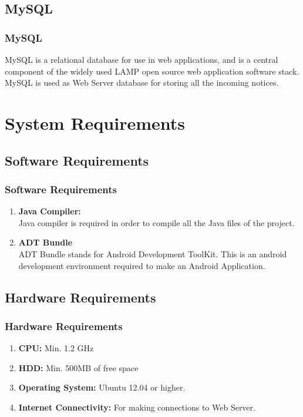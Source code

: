 \documentclass{beamer}   %
\begin{document}
\subsection{MySQL}
\begin{frame}
\frametitle{MySQL}
MySQL is a relational database for use in web applications, and is a central component of the widely used LAMP open source web application software stack.\\
MySQL is used as Web Server database for storing all the incoming notices.

\end{frame}

\section{System Requirements}
\subsection{Software Requirements}
\begin{frame}
\frametitle{Software Requirements}
\begin{enumerate}
\item \textbf{Java Compiler:}\\
Java compiler is required in order to compile all the Java files of the project.

\item \textbf{ADT Bundle}\\
ADT Bundle stands for Android Development ToolKit. This is an android development environment required to make an 
Android Application.
\end{enumerate}
\end{frame}
\subsection{Hardware Requirements}
\begin{frame}
\frametitle{Hardware Requirements}
\begin{enumerate}
\item \textbf{CPU:} Min. 1.2 GHz
\item \textbf{HDD:} Min. 500MB of free space
\item \textbf{Operating System:} Ubuntu 12.04 or higher.
\item \textbf{Internet Connectivity:} For making connections to Web Server.
\end{enumerate}
\end{frame}
\end{document}
